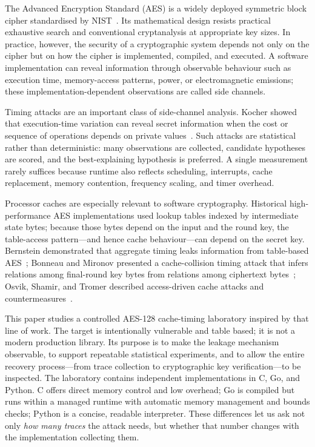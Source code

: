 \documentclass[11pt]{article}
\begin{document}
The Advanced Encryption Standard (AES) is a widely deployed symmetric block
cipher standardised by NIST~\cite{fips197}. Its mathematical design resists
practical exhaustive search and conventional cryptanalysis at appropriate key
sizes. In practice, however, the security of a cryptographic system depends not
only on the cipher but on how the cipher is implemented, compiled, and executed.
A software implementation can reveal information through observable behaviour
such as execution time, memory-access patterns, power, or electromagnetic
emissions; these implementation-dependent observations are called side channels.

Timing attacks are an important class of side-channel analysis. Kocher showed
that execution-time variation can reveal secret information when the cost or
sequence of operations depends on private values~\cite{kocher96}. Such attacks
are statistical rather than deterministic: many observations are collected,
candidate hypotheses are scored, and the best-explaining hypothesis is
preferred. A single measurement rarely suffices because runtime also reflects
scheduling, interrupts, cache replacement, memory contention, frequency scaling,
and timer overhead.

Processor caches are especially relevant to software cryptography. Historical
high-performance AES implementations used lookup tables indexed by intermediate
state bytes; because those bytes depend on the input and the round key, the
table-access pattern---and hence cache behaviour---can depend on the secret key.
Bernstein demonstrated that aggregate timing leaks information from table-based
AES~\cite{bernstein05}; Bonneau and Mironov presented a cache-collision timing
attack that infers relations among final-round key bytes from relations among
ciphertext bytes~\cite{bonneau06}; Osvik, Shamir, and Tromer described
access-driven cache attacks and countermeasures~\cite{osvik06}.

This paper studies a controlled AES-128 cache-timing laboratory inspired by that
line of work. The target is intentionally vulnerable and table based; it is not
a modern production library. Its purpose is to make the leakage mechanism
observable, to support repeatable statistical experiments, and to allow the
entire recovery process---from trace collection to cryptographic key
verification---to be inspected. The laboratory contains independent
implementations in C, Go, and Python. C offers direct memory control and low
overhead; Go is compiled but runs within a managed runtime with automatic memory
management and bounds checks; Python is a concise, readable interpreter. These
differences let us ask not only \emph{how many traces} the attack needs, but
whether that number changes with the implementation collecting them.
\end{document}
